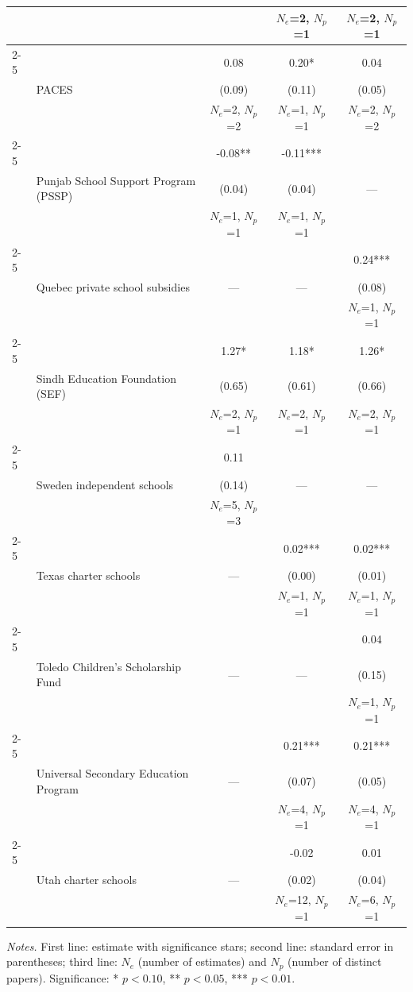 \begin{longtable}{@{\extracolsep{\fill}} l l c c c @{}}
  &  &  & $N_e$=2, $N_p$=1 & $N_e$=2, $N_p$=1 \\
\cmidrule(lr){2-5}
  &  & 0.08 & 0.20* & 0.04 \\
  & PACES & (0.09) & (0.11) & (0.05) \\
  &  & $N_e$=2, $N_p$=2 & $N_e$=1, $N_p$=1 & $N_e$=2, $N_p$=2 \\
\cmidrule(lr){2-5}
  &  & -0.08** & -0.11*** &  \\
  & Punjab School Support Program (PSSP) & (0.04) & (0.04) & --- \\
  &  & $N_e$=1, $N_p$=1 & $N_e$=1, $N_p$=1 &  \\
\cmidrule(lr){2-5}
  &  &  &  & 0.24*** \\
  & Quebec private school subsidies & --- & --- & (0.08) \\
  &  &  &  & $N_e$=1, $N_p$=1 \\
\cmidrule(lr){2-5}
  &  & 1.27* & 1.18* & 1.26* \\
  & Sindh Education Foundation (SEF) & (0.65) & (0.61) & (0.66) \\
  &  & $N_e$=2, $N_p$=1 & $N_e$=2, $N_p$=1 & $N_e$=2, $N_p$=1 \\
\cmidrule(lr){2-5}
  &  & 0.11 &  &  \\
  & Sweden independent schools & (0.14) & --- & --- \\
  &  & $N_e$=5, $N_p$=3 &  &  \\
\cmidrule(lr){2-5}
  &  &  & 0.02*** & 0.02*** \\
  & Texas charter schools & --- & (0.00) & (0.01) \\
  &  &  & $N_e$=1, $N_p$=1 & $N_e$=1, $N_p$=1 \\
\cmidrule(lr){2-5}
  &  &  &  & 0.04 \\
  & Toledo Children's Scholarship Fund & --- & --- & (0.15) \\
  &  &  &  & $N_e$=1, $N_p$=1 \\
\cmidrule(lr){2-5}
  &  &  & 0.21*** & 0.21*** \\
  & Universal Secondary Education Program & --- & (0.07) & (0.05) \\
  &  &  & $N_e$=4, $N_p$=1 & $N_e$=4, $N_p$=1 \\
\cmidrule(lr){2-5}
  &  &  & -0.02 & 0.01 \\
  & Utah charter schools & --- & (0.02) & (0.04) \\
  &  &  & $N_e$=12, $N_p$=1 & $N_e$=6, $N_p$=1 \\
\end{longtable}

\parbox{\linewidth}{\scriptsize \textit{Notes.} First line: estimate with significance stars; second line: standard error in parentheses; third line: $N_e$ (number of estimates) and $N_p$ (number of distinct papers). Significance: * $p<0.10$, ** $p<0.05$, *** $p<0.01$.}
